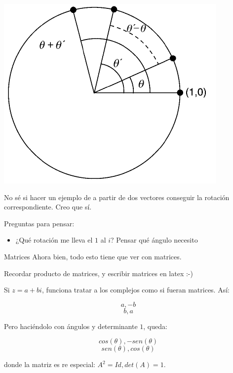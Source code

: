 \documentclass[10pt]{beamer}
\begin{document}
\begin{frame}
	
	\includegraphics[scale=1]{R2.png}
\end{frame}

\begin{frame}
	No sé si hacer un ejemplo de a partir de dos vectores conseguir la rotación correspondiente. Creo que sí.
\end{frame}

\begin{frame}
	Preguntas para pensar:
	
	\begin{itemize}
		\item ¿Qué rotación me lleva el $1$ al $i$? Pensar qué ángulo necesito
	\end{itemize}
\end{frame}


\begin{frame}{Matrices}
	Ahora bien, todo esto tiene que ver con matrices.
	
	Recordar producto de matrices, y escribir matrices en latex :-)

Si $z=a+bi$, funciona tratar a los complejos como si fueran matrices. Así:

$$a, -b$$
$$b, a$$

Pero haciéndolo con ángulos y determinante $1$, queda:

$$cos(\theta), -sen(\theta)$$
$$sen(\theta), cos(\theta)$$

donde la matriz es re especial: $A^2 = Id, det(A)=1$.



\end{frame}
\end{document}
